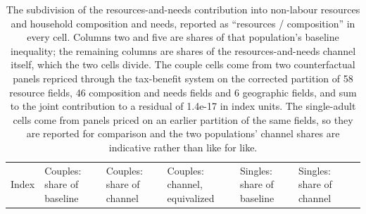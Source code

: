 \small\setlength{\tabcolsep}{3pt}\begin{longtable}[]{@{}
  >{\raggedright\arraybackslash}p{}
  >{\raggedright\arraybackslash}p{}
  >{\raggedright\arraybackslash}p{}
  >{\raggedright\arraybackslash}p{}
  >{\raggedright\arraybackslash}p{}
  >{\raggedright\arraybackslash}p{}
  >{\raggedright\arraybackslash}p{}@{}}
\caption{The subdivision of the resources-and-needs contribution into non-labour resources and household composition and needs, reported as ``resources / composition'' in every cell. Columns two and five are shares of that population's baseline inequality; the remaining columns are shares of the resources-and-needs channel itself, which the two cells divide. The couple cells come from two counterfactual panels repriced through the tax-benefit system on the corrected partition of 58 resource fields, 46 composition and needs fields and 6 geographic fields, and sum to the joint contribution to a residual of 1.4e-17 in index units. The single-adult cells come from panels priced on an earlier partition of the same fields, so they are reported for comparison and the two populations' channel shares are indicative rather than like for like.}\tabularnewline
\toprule\noalign{}
\begin{minipage}[b]{\linewidth}\raggedright
Index
\end{minipage} & \begin{minipage}[b]{\linewidth}\raggedright
Couples: share of baseline
\end{minipage} & \begin{minipage}[b]{\linewidth}\raggedright
Couples: share of channel
\end{minipage} & \begin{minipage}[b]{\linewidth}\raggedright
Couples: channel, equivalized
\end{minipage} & \begin{minipage}[b]{\linewidth}\raggedright
Singles: share of baseline
\end{minipage} & \begin{minipage}[b]{\linewidth}\raggedright
Singles: share of channel
\end{minipage} & \begin{minipage}[b]{\linewidth}\raggedright

\end{minipage}
\end{longtable}
